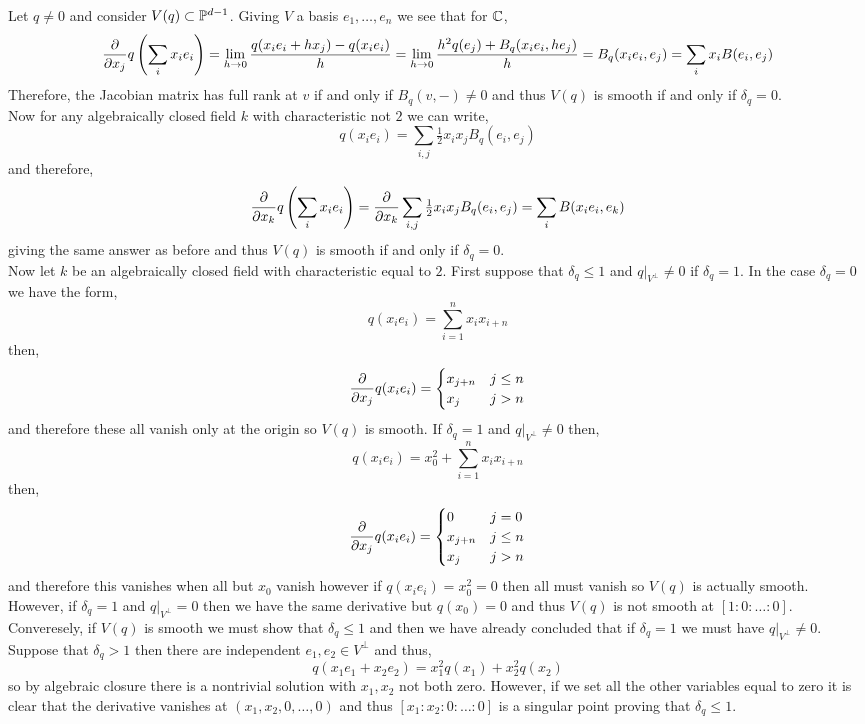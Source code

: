 \documentclass[12pt]{article}
\begin{document}
Let $q \neq 0$ and consider $V(q) \subset \P^{d-1}$. Giving $V$ a basis $e_1, \dots, e_n$ we see that for $\CC$,
\[ \pderiv{}{x_j} q \left( \sum_i x_i e_i \right) = \lim_{h \to 0} \frac{q(x_i e_i + h x_j) - q(x_i e_i)}{h}  =  \lim_{h \to 0} \frac{h^2 q(e_j) + B_q(x_i e_i, h e_j)}{h} = B_q(x_i e_i, e_j) = \sum_i x_i B(e_i, e_j) \]
Therefore, the Jacobian matrix has full rank at $v$ if and only if $B_q(v, -) \neq 0$ and thus $V(q)$ is smooth if and only if $\delta_q = 0$.
\bigskip\\
Now for any algebraically closed field $k$ with characteristic not $2$ we can write,
\[ q(x_i e_i) = \sum_{i,j} \tfrac{1}{2} x_i x_j B_q(e_i, e_j) \]
and therefore, 
\[ \pderiv{}{x_k} q \left( \sum_i x_i e_i \right) = \pderiv{}{x_k} \sum_{i,j} \tfrac{1}{2} x_i x_j B_q(e_i, e_j) = \sum_i B(x_i e_i, e_k) \]
giving the same answer as before and thus $V(q)$ is smooth if and only if $\delta_q = 0$.
\bigskip\\
Now let $k$ be an algebraically closed field with characteristic equal  to $2$. First suppose that $\delta_q \le 1$ and $q|_{V^\perp} \neq 0$ if $\delta_q = 1$. In the case $\delta_q = 0$ we have the form,
\[ q(x_i e_i) = \sum_{i = 1}^n x_i x_{i + n} \]
then,
\[ \pderiv{}{x_j} q(x_i e_i) = 
\begin{cases}
x_{j + n} & j \le n
\\
x_j & j > n
\end{cases} \]
and therefore these all vanish only at the origin so $V(q)$ is smooth.  If $\delta_q = 1$ and $q|_{V^\perp} \neq 0$ then,
\[ q(x_i e_i) =  x_0^2 + \sum_{i = 1}^n x_i x_{i + n} \]
then,
\[ \pderiv{}{x_j} q(x_i e_i) = 
\begin{cases}
0 & j = 0
\\
x_{j + n} & j \le n
\\
x_j & j > n
\end{cases} \]
and therefore this vanishes when all but $x_0$ vanish however if $q(x_i e_i) = x_0^2 = 0$ then all must vanish so $V(q)$ is actually smooth. However, if $\delta_q = 1$ and $q|_{V^\perp} = 0$ then we have the same derivative but $q(x_0) = 0$ and thus $V(q)$ is not smooth at $[1 : 0 : \dots : 0]$.
\bigskip\\
Converesely, if $V(q)$ is smooth we must show that $\delta_q \le 1$ and then we have already concluded that if $\delta_q = 1$ we must have $q|_{V^\perp} \neq 0$. Suppose that $\delta_q > 1$ then there are independent $e_1, e_2 \in V^\perp$ and thus,
\[ q(x_1 e_1 + x_2 e_2) = x_1^2 q(x_1) + x_2^2 q(x_2) \]
so by algebraic closure there is a nontrivial solution with $x_1, x_2$ not both zero. However, if we set all the other variables equal to zero it is clear that the derivative vanishes at $(x_1, x_2, 0, \dots, 0)$ and thus $[x_1 : x_2 : 0 : \dots : 0]$ is a singular point proving that $\delta_q \le 1$. 
\end{document}
